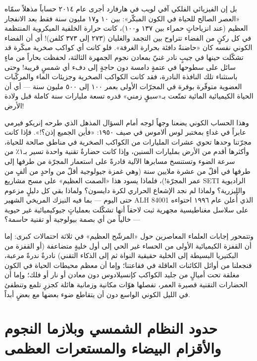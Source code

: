 \documentclass[12pt,a4paper,openany]{book}
\begin{document}
بل إن الفيزيائي الفلكي آفي لويب في هارفارد أجرى عام ٢٠١٤ حساباً مذهلاً سمّاه «العصر الصالح للحياة في الكون المبكّر»: بين ١٠ و١٧ مليون سنة فقط بعد الانفجار العظيم (عند انزياحاتٍ حمراء بين ١٣٧ و١٠٠)، كانت حرارة الخلفية الميكروية المنتظمة في كل ركنٍ من الفضاء تتراوح بين التجمد والغليان (٢٧٣ إلى ٣٧٣ كلفن)! أي أن الفضاء الكوني نفسه كان «حاضنةً دافئة بحرارة الغرفة». فلو كانت أي كواكب صخرية مبكّرة قد تشكّلت حينها في جيبٍ نادر غنيّ بمعادن نجوم الجمهرة الثالثة، لحفظت بحاراً من ماءٍ سائل على سطوحها في عتمةٍ دامسة دون حاجةٍ إلى دفء أي شمسٍ قريبة! وحتى باستثناء تلك النافذة النادرة، فقد كانت الكواكب الصخرية وجزيئات الماء والمركّبات العضوية متوفّرة بوفرة في المجرّات الأولى بعمر ١٠٠ إلى ٥٠٠ مليون سنة — أي أن الحياة الكيميائية المائية تمتّعت بـ«سبقٍ زمني» قدره تسعة مليارات سنة كاملة قبل ولادة الأرض!


وهذا الحساب الكوني يضعنا وجهاً لوجه أمام السؤال المذهل الذي طرحه إنريكو فيرمي عابراً في غداءٍ بمختبر لوس ألاموس في صيف ١٩٥٠: «فأين الجميع إذن؟!». فإذا كانت مجرّتنا وحدها تحوي عشرات المليارات من الكواكب الصخرية في مناطق صالحة للحياة، وأكثرها أقدم من الأرض بمليارات السنين، وإذا كانت حضارةٌ تقنية واحدة تسير بـ١٪ من سرعة الضوء وتستنسخ مسابرها الآلية قادرةً على استعمار المجرّة من طرفها إلى طرفها في أقلّ من عشرة ملايين سنة (وهي غمزة جيولوجية أقلّ من واحدٍ من ألفٍ من عمر المجرّة!)، فلماذا يسود هذا «الصمت العظيم» على مسح مشاريع SETI الراديوية والليزرية؟ ولماذا لم نجد الإشعاع الحراري لكرة دايسون؟ ولماذا بقي كل دليلٍ مزعوم حتى اليوم — بما فيه النيزك المريخي الشهير ALH 84001 الذي أُعلن عام ١٩٩٦ احتواءه على سلاسل مغناطيسية مجهرية ثبت لاحقاً أنها تشكّلت بعملياتٍ جيوكيميائية غير حيوية — خالياً من أي بصمة بيولوجية أو تقنية حاسمة؟


وتتمحور إجابات العلماء المعاصرين حول «المرشّح العظيم» في ثلاثة احتمالات كبرى: إما أن القفزة الكيميائية الأولى من الحساء غير الحي إلى أول خليةٍ متضاعفة (أو القفزة من البكتيريا البسيطة إلى الخلية حقيقية النواة ثم إلى الذكاء التقني) نادرةٌ ندرةً مرعبة، فنجعلنا من أوائل الكائنات العاقلة في فقاعتنا؛ وإما أن معظم محيطات الحياة في الكون مغلقة تحت أميالٍ من جليد الكواكب كإنسيلادوس دون معادن أو نار أو فلك؛ وإما أن الحضارات التقنية قصيرة العمر، تفصلها هوّات مكانية وزمانية هائلة كجزرٍ تلمع وتنطفئ في الليل الكوني الواسع دون أن يتقاطع ضوء بعضها مع بعضٍ أبداً.


\chapter*{حدود النظام الشمسي وبلازما النجوم والأقزام البيضاء والمستعرات العظمى}

\end{document}

